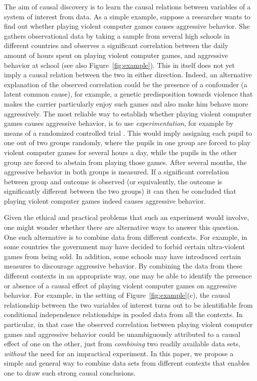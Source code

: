 \documentclass[twoside,11pt]{article}
\begin{document}
The aim of causal discovery is to learn the causal relations between variables
of a system of interest from data. As a simple example, suppose a researcher
wants to find out whether playing violent computer games causes aggressive
behavior. She gathers observational data by taking a sample from several high
schools in different countries and observes a significant correlation between the daily amount of hours
spent on playing violent computer games, and aggressive behavior at
school (see also Figure~\ref{fig:example}).
This in itself does not yet imply a causal relation between the two in either direction.
Indeed, an alternative explanation of the observed correlation could be the
presence of a confounder (a latent common cause), for example, a genetic
predisposition towards violence that makes the carrier particularly enjoy such
games and also make him behave more aggressively. 
The most reliable way to establish whether playing violent computer games
causes aggressive behavior, is to use \emph{experimentation}, for example by
means of a randomized controlled trial \citep{Fisher1935}.
This would imply assigning each pupil to one out of two groups randomly, 
where the pupils in one group are forced to play violent computer games for
several hours a day,
while the pupils in the other group are forced to abstain from playing those games.
After several months, the aggressive behavior in both groups is measured. 
If a significant correlation between group and outcome is observed (or 
equivalently, the outcome is significantly different between the two groups)
it can then be concluded that playing violent computer
games indeed causes aggressive behavior.

Given the ethical and practical problems that such an experiment would involve, 
one might wonder whether there are alternative ways to answer this question. One such
alternative is to combine data from different
contexts. For example, in some countries the government may have decided
to forbid certain ultra-violent games from being sold. In addition, some schools may have introduced
certain measures to discourage aggressive behavior. By combining the data
from these different contexts in an appropriate way, one may be able to identify
the presence or absence of a causal effect of playing violent computer games
on aggressive behavior. For example, in the setting of Figure~\ref{fig:example}(c),
the causal relationship between the two variables of interest turns out to 
be identifiable from conditional independence relationships in pooled data 
from all the contexts.
In particular, in that case the observed correlation between playing violent
computer games and aggressive behavior could be unambiguously attributed to a 
causal effect of one on the other, just from \emph{combining} two readily
available data sets, \emph{without} the need for an impractical experiment.
In this paper, we propose a simple and general way to combine data sets from 
different contexts that enables one to draw such strong causal conclusions.
\end{document}
